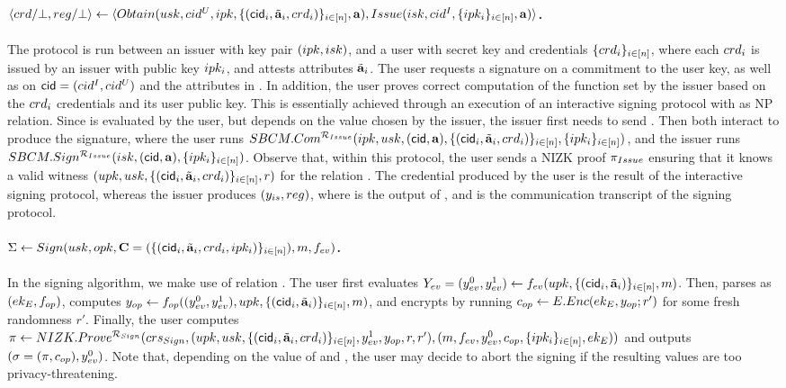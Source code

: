 \paragraph{$\langle crd/\bot,reg/\bot \rangle \gets
  \langle Obtain(usk,cid^U,ipk,\lbrace (\mathsf{cid}_i,\tilde{\mathbf{a}}_i,crd_i) \rbrace_{i\in[n]},
  \mathbf{a}),Issue(isk,cid^I,\lbrace ipk_i \rbrace_{i\in[n]},\mathbf{a})\rangle$.} %
The protocol is run between an issuer with key pair $(ipk,isk)$, and a user
with secret key \usk and credentials $\lbrace crd_i \rbrace_{i\in[n]}$, where
each $crd_i$ is issued by an issuer with public key $ipk_i$, and
attests attributes $\tilde{\mathbf{a}}_i$. The user requests a signature on a commitment to
the user key, as well as on $\mathsf{cid}=(cid^I,cid^U)$ and the attributes in \attrs.
In addition, the user proves correct computation of the \fissue function set by
the issuer based on the $crd_i$ credentials and its user public key.
This is essentially achieved through an execution of an \SBCM interactive
signing protocol with \RelIss as NP relation. Since \fissue is
evaluated by the user, but depends on the \cidi value chosen by the issuer, the
issuer first needs to send \cidi.
Then both interact to produce the \SBCM signature, where the
user runs $SBCM.Com^{\mathcal{R}_{Issue}}(ipk,usk,(\mathsf{cid},\mathbf{a}),\lbrace (\mathsf{cid}_i,
\tilde{\mathbf{a}}_i,crd_i)\rbrace_{i\in[n]},\lbrace ipk_i \rbrace_{i\in[n]})$, and the
issuer runs $SBCM.Sign^{\mathcal{R}_{Issue}}(isk,(\mathsf{cid},\mathbf{a}),\lbrace ipk_i
\rbrace_{i\in[n]})$. Observe that, within this protocol, the user sends a NIZK
proof $\pi_{Issue}$ ensuring that it knows a valid witness $(upk,usk,
\lbrace (\mathsf{cid}_i,\tilde{\mathbf{a}}_i,crd_i)\rbrace_{i \in [n]},r)$ for the relation
\RelIss. The credential \cred produced by the user is the result of
the interactive signing protocol, whereas the issuer produces $(y_{is},
reg)$, where \yissue is the output of \fissue, and \utrans is the
communication transcript of the signing protocol.%

\paragraph{$\Sigma \gets Sign(usk,opk,
  \mathbf{C}=(\lbrace (\mathsf{cid}_i,\tilde{\mathbf{a}}_i,crd_i,ipk_i)\rbrace_{i\in[n]}),
  m,f_{ev})$.} %
In the signing algorithm, we make use of relation \RelSig.
% 
The user first evaluates $Y_{ev} = (y_{ev}^0,y_{ev}^1) \gets f_{ev} (upk,
\lbrace(\mathsf{cid}_i,\tilde{\mathbf{a}}_i)\rbrace_{i\in[n]},m)$. Then, parses \opk as $(ek_{E},
f_{op})$, computes $y_{op} \gets f_{op}((y_{ev}^0,y_{ev}^1),upk,
\lbrace(\mathsf{cid}_i,\tilde{\mathbf{a}}_i)\rbrace_{i\in[n]},m)$, and encrypts
\yinsp by running $c_{op} \gets E.Enc(ek_{E},y_{op}; r')$ for some fresh
randomness $r'$. Finally, the user computes $\pi \gets
NIZK.Prove^{\mathcal{R}_{Sign}}(crs_{Sign},(upk,usk,\lbrace(\mathsf{cid}_i,
\tilde{\mathbf{a}}_i,crd_i)\rbrace_{i\in[n]},y_{ev}^1,y_{op},r,r'),(m,
f_{ev},y_{ev}^0,c_{op},\lbrace ipk_i\rbrace_{i\in[n]},ek_{E}))$ and outputs
$(\sigma = (\pi,c_{op}),y_{ev}^0)$. Note that, depending on the value of
\Yeval and \yinsp, the user may decide to abort
the signing if the resulting values are too privacy-threatening.

